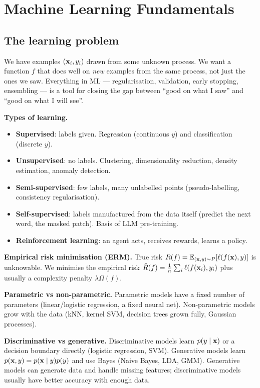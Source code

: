 \chapter{Machine Learning Fundamentals}
\label{ch:mlfund}

\section{The learning problem}
\begin{intuition}
We have examples $(\mathbf{x}_i,y_i)$ drawn from some unknown process. We want a function $f$ that does well on \emph{new} examples from the same process, not just the ones we saw. Everything in ML --- regularisation, validation, early stopping, ensembling --- is a tool for closing the gap between ``good on what I saw'' and ``good on what I will see''.
\end{intuition}

\textbf{Types of learning.}
\begin{itemize}
  \item \textbf{Supervised}: labels given. Regression (continuous $y$) and classification (discrete $y$).
  \item \textbf{Unsupervised}: no labels. Clustering, dimensionality reduction, density estimation, anomaly detection.
  \item \textbf{Semi-supervised}: few labels, many unlabelled points (pseudo-labelling, consistency regularisation).
  \item \textbf{Self-supervised}: labels manufactured from the data itself (predict the next word, the masked patch). Basis of LLM pre-training.
  \item \textbf{Reinforcement learning}: an agent acts, receives rewards, learns a policy.
\end{itemize}

\textbf{Empirical risk minimisation (ERM).} True risk $R(f)=\mathbb{E}_{(\mathbf{x},y)\sim P}[\ell(f(\mathbf{x}),y)]$ is unknowable. We minimise the empirical risk $\hat R(f)=\frac1n\sum_i\ell(f(\mathbf{x}_i),y_i)$ plus usually a complexity penalty $\lambda\Omega(f)$.

\textbf{Parametric vs non-parametric.} Parametric models have a fixed number of parameters (linear/logistic regression, a fixed neural net). Non-parametric models grow with the data (kNN, kernel SVM, decision trees grown fully, Gaussian processes).

\textbf{Discriminative vs generative.} Discriminative models learn $p(y\mid\mathbf{x})$ or a decision boundary directly (logistic regression, SVM). Generative models learn $p(\mathbf{x},y)=p(\mathbf{x}\mid y)p(y)$ and use Bayes (Naive Bayes, LDA, GMM). Generative models can generate data and handle missing features; discriminative models usually have better accuracy with enough data.

